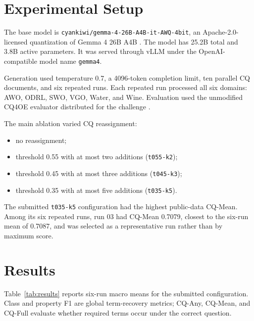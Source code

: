 \documentclass{ceurart}
\begin{document}
\section{Experimental Setup}

The base model is
\texttt{cyankiwi/gemma-4-26B-A4B-it-AWQ-4bit}, an Apache-2.0-licensed
quantization of Gemma 4 26B A4B \cite{gemma}. The model has 25.2B total and
3.8B active parameters. It was served through vLLM under the OpenAI-compatible
model name \texttt{gemma4}.

Generation used temperature 0.7, a 4096-token completion limit, ten parallel
CQ documents, and six repeated runs. Each repeated run processed all six
domains: AWO, ODRL, SWO, VGO, Water, and Wine. Evaluation used the unmodified
CQ4OE evaluator distributed for the challenge \cite{cq4oe,challenge}.

The main ablation varied CQ reassignment:
\begin{itemize}
  \item no reassignment;
  \item threshold 0.55 with at most two additions (\texttt{t055-k2});
  \item threshold 0.45 with at most three additions (\texttt{t045-k3});
  \item threshold 0.35 with at most five additions (\texttt{t035-k5}).
\end{itemize}

The submitted \texttt{t035-k5} configuration had the highest public-data
CQ-Mean. Among its six repeated runs, run 03 had CQ-Mean 0.7079, closest to the
six-run mean of 0.7087, and was selected as a representative run rather than
by maximum score.

\section{Results}

Table~\ref{tab:results} reports six-run macro means for the submitted
configuration. Class and property F1 are global term-recovery metrics;
CQ-Any, CQ-Mean, and CQ-Full evaluate whether required terms occur under the
correct question.
\end{document}
